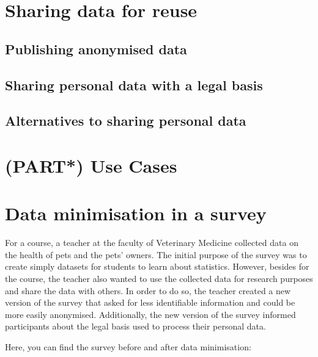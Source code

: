 \documentclass[
]{book}
\begin{document}
\hypertarget{data-sharing-reuse}{%
\chapter{Sharing data for reuse}\label{data-sharing-reuse}}

\hypertarget{publish-anonymous-data}{%
\section{Publishing anonymised data}\label{publish-anonymous-data}}

\hypertarget{share-reuse-legal-basis}{%
\section{Sharing personal data with a legal basis}\label{share-reuse-legal-basis}}

\hypertarget{sharing-reuse-alternatives}{%
\section{Alternatives to sharing personal data}\label{sharing-reuse-alternatives}}

\hypertarget{part-use-cases}{%
\chapter{(PART*) Use Cases}\label{part-use-cases}}

\hypertarget{pet-survey}{%
\chapter{Data minimisation in a survey}\label{pet-survey}}

For a course, a teacher at the faculty of Veterinary Medicine collected data on
the health of pets and the pets' owners. The initial purpose of the survey was
to create simply datasets for students to learn about statistics. However,
besides for the course, the teacher also wanted to use the collected data for
research purposes and share the data with others. In order to do so, the teacher
created a new version of the survey that asked for less identifiable information
and could be more easily anonymised. Additionally, the new version of the survey
informed participants about the legal basis used to process their personal data.

Here, you can find the survey before and after data minimisation:
\end{document}
